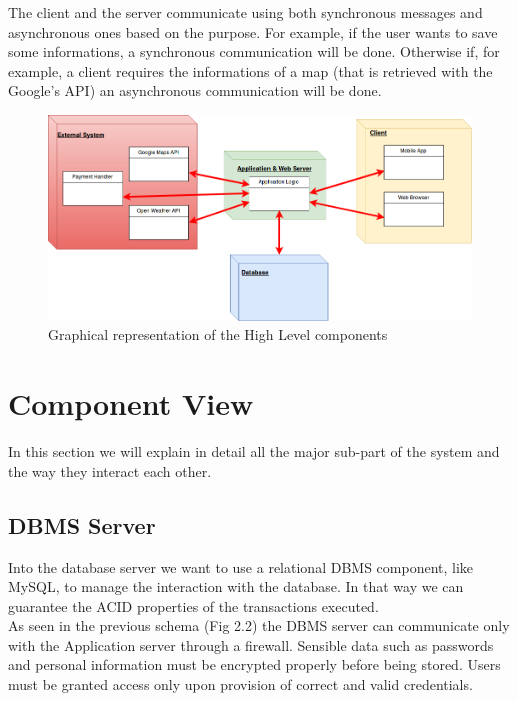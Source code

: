 \documentclass[numbers=noenddot, 12pt, a4paper, oneside]{scrbook}
\begin{document}
The client and the server communicate using both synchronous messages and asynchronous ones based on the purpose. For example, if the user wants to save some informations, a synchronous communication will be done. Otherwise if, for example, a client requires the informations of a map (that is retrieved with the Google's API) an asynchronous communication will be done.\\

\begin{figure}[H]
	\centering
	\includegraphics[width=1.1\textwidth]{images/HighLevelComponent}
	\caption{Graphical representation of the High Level components}
\end{figure}

\section{Component View}

In this section we will explain in detail all the major sub-part of the system and the way they interact each other.

\subsection*{DBMS Server}

Into the database server we want to use a relational DBMS component, like MySQL, to manage the interaction with the database. In that way we can guarantee the ACID properties of the transactions executed.\\

As seen in the previous schema (Fig 2.2) the DBMS server can communicate only with the Application server through a firewall. Sensible data such as passwords and personal information must be encrypted properly before being stored. Users must be granted access only upon provision of correct and valid credentials.\\
\end{document}
